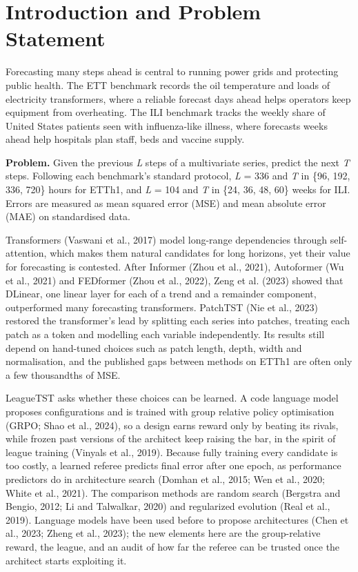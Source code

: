 \documentclass[11pt,letterpaper]{article}
\begin{document}
\section{Introduction and Problem Statement}
Forecasting many steps ahead is central to running power grids and protecting public health. The ETT benchmark records the oil temperature and loads of electricity transformers, where a reliable forecast days ahead helps operators keep equipment from overheating. The ILI benchmark tracks the weekly share of United States patients seen with influenza-like illness, where forecasts weeks ahead help hospitals plan staff, beds and vaccine supply.

\textbf{Problem.} Given the previous \textit{L} steps of a multivariate series, predict the next \textit{T} steps. Following each benchmark's standard protocol, \textit{L} = 336 and \textit{T} in \{96, 192, 336, 720\} hours for ETTh1, and \textit{L} = 104 and \textit{T} in \{24, 36, 48, 60\} weeks for ILI. Errors are measured as mean squared error (MSE) and mean absolute error (MAE) on standardised data.

Transformers (Vaswani et al., 2017) model long-range dependencies through self-attention, which makes them natural candidates for long horizons, yet their value for forecasting is contested. After Informer (Zhou et al., 2021), Autoformer (Wu et al., 2021) and FEDformer (Zhou et al., 2022), Zeng et al. (2023) showed that DLinear, one linear layer for each of a trend and a remainder component, outperformed many forecasting transformers. PatchTST (Nie et al., 2023) restored the transformer's lead by splitting each series into patches, treating each patch as a token and modelling each variable independently. Its results still depend on hand-tuned choices such as patch length, depth, width and normalisation, and the published gaps between methods on ETTh1 are often only a few thousandths of MSE.

LeagueTST asks whether these choices can be learned. A code language model proposes configurations and is trained with group relative policy optimisation (GRPO; Shao et al., 2024), so a design earns reward only by beating its rivals, while frozen past versions of the architect keep raising the bar, in the spirit of league training (Vinyals et al., 2019). Because fully training every candidate is too costly, a learned referee predicts final error after one epoch, as performance predictors do in architecture search (Domhan et al., 2015; Wen et al., 2020; White et al., 2021). The comparison methods are random search (Bergstra and Bengio, 2012; Li and Talwalkar, 2020) and regularized evolution (Real et al., 2019). Language models have been used before to propose architectures (Chen et al., 2023; Zheng et al., 2023); the new elements here are the group-relative reward, the league, and an audit of how far the referee can be trusted once the architect starts exploiting it.
\end{document}
